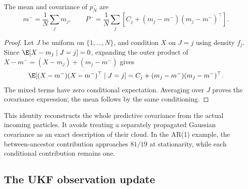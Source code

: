 \begin{proposition}
The mean and covariance of \(p_N^-\) are
\begin{equation}
\label{eq:bf-covariance-proposal-mixture-moments}
 m^-=\frac1N\sum_jm_j,\qquad
 P^-=\frac1N\sum_j\left[
 C_j+(m_j-m^-)(m_j-m^-)^\top\right].
\end{equation}
\end{proposition}
\begin{proof}
Let \(J\) be uniform on \(\{1,\ldots,N\}\), and condition \(X\) on
\(J=j\) using density \(f_j\). Since
\(\E[X-m_j\mid J=j]=0\), expanding the outer product of
\(X-m^-=(X-m_j)+(m_j-m^-)\) gives
\[
 \E[(X-m^-)(X-m^-)^\top\mid J=j]
 =C_j+(m_j-m^-)(m_j-m^-)^\top .
\]
The mixed terms have zero conditional expectation. Averaging over \(J\)
proves the covariance expression; the mean follows by the same conditioning.
\end{proof}

This identity reconstructs the whole predictive covariance from the actual
incoming particles. It avoids treating a separately propagated Gaussian
covariance as an exact description of their cloud. In the AR(1) example,
the between-ancestor contribution approaches \(81/19\) at stationarity,
while each conditional contribution remains one.

\subsection{The UKF observation update}

